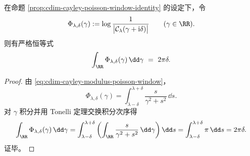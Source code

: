 \begin{corollary}\label{cor:cdim-cayley-window-mass-conservation}
在命题 \ref{prop:cdim-cayley-poisson-window-identity} 的设定下，令
\[
\Phi_{\lambda,\delta}(\gamma):=\log\frac{1}{\bigl|\mathcal{C}_{\lambda}(\gamma+\mathrm{i}\delta)\bigr|}
\qquad(\gamma\in\RR).
\]
则有严格恒等式
\[
\int_{\RR}\Phi_{\lambda,\delta}(\gamma)\,\dd\gamma\ =\ 2\pi\delta.
\]
\end{corollary}
\begin{proof}
由 \eqref{eq:cdim-cayley-modulus-poisson-window}，
\[
\Phi_{\lambda,\delta}(\gamma)=\int_{\lambda-\delta}^{\lambda+\delta}\frac{s}{\gamma^{2}+s^{2}}\,\dd s.
\]
对 \(\gamma\) 积分并用 Tonelli 定理交换积分次序得
\[
\int_{\RR}\Phi_{\lambda,\delta}(\gamma)\,\dd\gamma
=\int_{\lambda-\delta}^{\lambda+\delta}\left(\int_{\RR}\frac{s}{\gamma^{2}+s^{2}}\,\dd\gamma\right)\dd s
=\int_{\lambda-\delta}^{\lambda+\delta}\pi\,\dd s
=2\pi\delta.
\]
证毕。
\end{proof}

